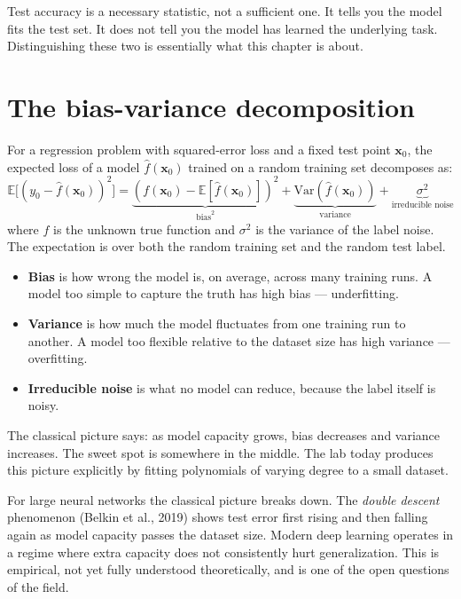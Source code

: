 \begin{intuition}
Test accuracy is a necessary statistic, not a sufficient one. It tells you the model fits the test set. It does not tell you the model has learned the underlying task. Distinguishing these two is essentially what this chapter is about.
\end{intuition}

\section{The bias-variance decomposition}

For a regression problem with squared-error loss and a fixed test point $\bm{x}_0$, the expected loss of a model $\hat{f}(\bm{x}_0)$ trained on a random training set decomposes as:
\[
\mathbb{E}\bigl[(y_0 - \hat{f}(\bm{x}_0))^2\bigr] = \underbrace{(f(\bm{x}_0) - \mathbb{E}[\hat{f}(\bm{x}_0)])^2}_{\text{bias}^2} + \underbrace{\mathrm{Var}(\hat{f}(\bm{x}_0))}_{\text{variance}} + \underbrace{\sigma^2}_{\text{irreducible noise}}
\]
where $f$ is the unknown true function and $\sigma^2$ is the variance of the label noise. The expectation is over both the random training set and the random test label.

\begin{itemize}
  \item \textbf{Bias} is how wrong the model is, on average, across many training runs. A model too simple to capture the truth has high bias --- underfitting.
  \item \textbf{Variance} is how much the model fluctuates from one training run to another. A model too flexible relative to the dataset size has high variance --- overfitting.
  \item \textbf{Irreducible noise} is what no model can reduce, because the label itself is noisy.
\end{itemize}

The classical picture says: as model capacity grows, bias decreases and variance increases. The sweet spot is somewhere in the middle. The lab today produces this picture explicitly by fitting polynomials of varying degree to a small dataset.

\begin{aitip}
For large neural networks the classical picture breaks down. The \emph{double descent} phenomenon (Belkin et al., 2019) shows test error first rising and then falling again as model capacity passes the dataset size. Modern deep learning operates in a regime where extra capacity does not consistently hurt generalization. This is empirical, not yet fully understood theoretically, and is one of the open questions of the field.
\end{aitip}

